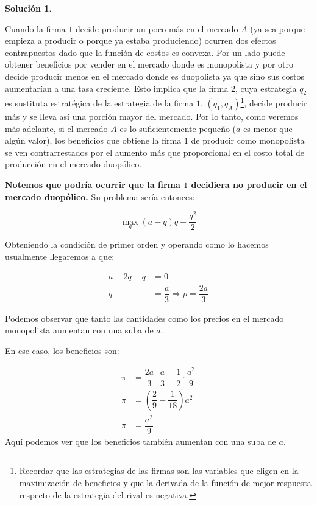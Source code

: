\documentclass[a4paper, 11pt]{article}
\theoremstyle{definition}
\newtheorem{solucion}{Soluci\'on}
\begin{document}
\begin{solucion}
\begin{enumerate}[label=(\alph*)]
\begin{enumerate}[label=\roman*.]
 Cuando la firma $1$ decide producir un poco más en el mercado $A$ (ya sea porque empieza a producir o porque ya estaba produciendo) ocurren dos efectos contrapuestos dado que la función de costos es convexa. Por un lado puede obtener beneficios por vender en el mercado donde es monopolista y por otro decide producir menos en el mercado donde es duopolista ya que sino sus costos aumentarían a una tasa creciente. Esto implica que la firma $2$, cuya estrategia $q_2$ es sustituta estratégica de la estrategia de la firma $1$, $(q_1,q_A)$\footnote{Recordar que las estrategias de las firmas son las variables que eligen en la maximización de beneficios y que la derivada de la función de mejor respuesta respecto de la estrategia del rival es negativa.}, decide producir más y se lleva así una porción mayor del mercado. 
 Por lo tanto, como veremos más adelante, si el mercado $A$ es lo suficientemente pequeño ($a$ es menor que algún valor), los beneficios que obtiene la firma $1$ de producir como monopolista se ven contrarrestados por el aumento más que proporcional en el costo total de producción en el mercado duopólico.
 
 \vspace{12pt}
 \textbf{Notemos que podría ocurrir que la firma $1$ decidiera no producir en el mercado duopólico.} Su problema sería entonces:
 
 \vspace*{-18pt}
 
 \[\displaystyle\max_q (a-q)q- \dfrac{q^2}{2}\]
  
 Obteniendo la condición de primer orden y operando como lo hacemos usualmente llegaremos a que:
 
 \vspace*{-32pt}
 
 \begin{align*}
 a-2q-q&=0\\
 q&=\dfrac{a}{3} \Longrightarrow p=\dfrac{2a}{3}
 \end{align*}
 
 Podemos observar que tanto las cantidades como los precios en el mercado monopolista aumentan con una suba de $a$.
 
 En ese caso, los beneficios son:
 
 \vspace*{-28pt}
 
  \begin{align*}
 \pi&=\dfrac{2a}{3}\cdot\dfrac{a}{3}-\dfrac{1}{2}\cdot\dfrac{a^2}{9}\\
 \pi&=\left(\dfrac{2}{9}-\dfrac{1}{18}\right)a^2\\
 \pi&=\dfrac{a^2}{9}
 \end{align*}
 Aquí podemos ver que los beneficios también aumentan con una suba de $a$. 


\end{enumerate}
\end{enumerate}
\end{solucion}
\end{document}
